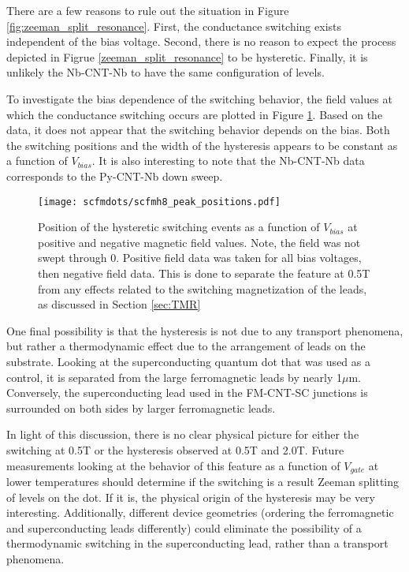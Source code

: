 There are a few reasons to rule out the situation in Figure \ref{fig:zeeman_split_resonance}. First, the conductance switching exists independent of the bias voltage. Second, there is no reason to expect the process depicted in Figrue \ref{zeeman_split_resonance} to be hysteretic. Finally, it is unlikely the Nb-CNT-Nb to have the same configuration of levels.

To investigate the bias dependence of the switching behavior, the field values at which the conductance switching occurs are plotted in Figure \ref{fig:scfmh8_peak_positions}. Based on the data, it does not appear that the switching behavior depends on the bias. Both the switching positions and the width of the hysteresis appears to be constant as a function of $V_{bias}$. It is also interesting to note that the Nb-CNT-Nb data corresponds to the Py-CNT-Nb down sweep.

\begin{figure}
    \centering
    \texttt{[image: scfmdots/scfmh8\_peak\_positions.pdf]}
    \caption{Position of the hysteretic switching events as a function of $V_{bias}$ at positive and negative magnetic field values. Note, the field was not swept through 0. Positive field data was taken for all bias voltages, then negative field data. This is done to separate the feature at 0.5T from any effects related to the switching magnetization of the leads, as discussed in Section \ref{sec:TMR}}
    \label{fig:scfmh8_peak_positions}
\end{figure}

One final possibility is that the hysteresis is not due to any transport phenomena, but rather a thermodynamic effect due to the arrangement of leads on the substrate. Looking at the superconducting quantum dot that was used as a control, it is separated from the large ferromagnetic leads by nearly 1$\mu$m. Conversely, the superconducting lead used in the FM-CNT-SC junctions is surrounded on both sides by larger ferromagnetic leads. 

In light of this discussion, there is no clear physical picture for either the switching at 0.5T or the hysteresis observed at 0.5T and 2.0T. Future measurements looking at the behavior of this feature as a function of $V_{gate}$ at lower temperatures should determine if the switching is a result Zeeman splitting of levels on the dot. If it is, the physical origin of the hysteresis may be very interesting. Additionally, different device geometries (ordering the ferromagnetic and superconducting leads differently) could eliminate the possibility of a thermodynamic switching in the superconducting lead, rather than a transport phenomena.